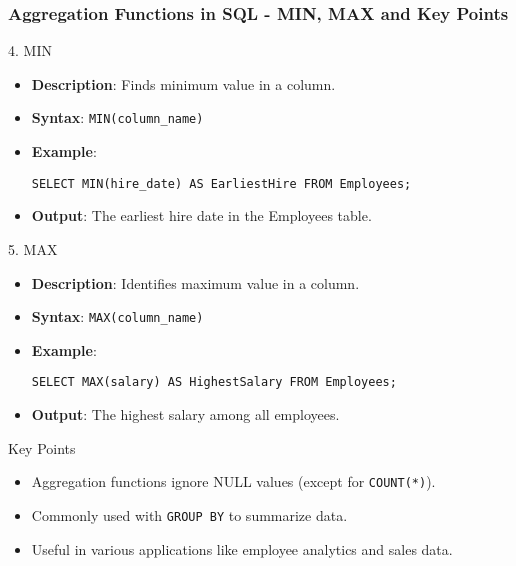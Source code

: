 \documentclass[aspectratio=169]{beamer}
\begin{document}
\begin{frame}[fragile]
    \frametitle{Aggregation Functions in SQL - MIN, MAX and Key Points}
    \begin{block}{4. MIN}
        \begin{itemize}
            \item \textbf{Description}: Finds minimum value in a column.
            \item \textbf{Syntax}: \texttt{MIN(column\_name)}
            \item \textbf{Example}:
            \begin{lstlisting}
SELECT MIN(hire_date) AS EarliestHire FROM Employees;
            \end{lstlisting}
            \item \textbf{Output}: The earliest hire date in the Employees table.
        \end{itemize}
    \end{block}

    \begin{block}{5. MAX}
        \begin{itemize}
            \item \textbf{Description}: Identifies maximum value in a column.
            \item \textbf{Syntax}: \texttt{MAX(column\_name)}
            \item \textbf{Example}:
            \begin{lstlisting}
SELECT MAX(salary) AS HighestSalary FROM Employees;
            \end{lstlisting}
            \item \textbf{Output}: The highest salary among all employees.
        \end{itemize}
    \end{block}

    \begin{block}{Key Points}
        \begin{itemize}
            \item Aggregation functions ignore NULL values (except for \texttt{COUNT(*)}).
            \item Commonly used with \texttt{GROUP BY} to summarize data.
            \item Useful in various applications like employee analytics and sales data.
        \end{itemize}
    \end{block}
\end{frame}
\end{document}
